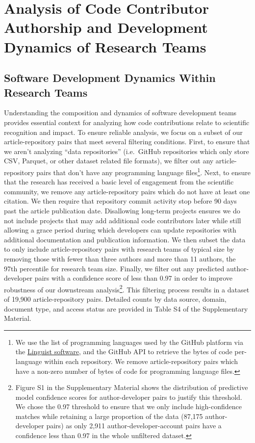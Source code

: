 \documentclass[
  number,
  3p,
  onecolumn]{elsarticle}
\begin{document}
\section{Analysis of Code Contributor Authorship and Development
Dynamics of Research
Teams}\label{analysis-of-code-contributor-authorship-and-development-dynamics-of-research-teams}

\subsection{Software Development Dynamics Within Research
Teams}\label{software-development-dynamics-within-research-teams}

Understanding the composition and dynamics of software development teams
provides essential context for analyzing how code contributions relate
to scientific recognition and impact. To ensure reliable analysis, we
focus on a subset of our article-repository pairs that meet several
filtering conditions. First, to ensure that we aren't analyzing ``data
repositories'' (i.e.~GitHub repositories which only store CSV, Parquet,
or other dataset related file formats), we filter out any
article-repository pairs that don't have any programming language
files\footnote{We use the list of programming languages used by the
  GitHub platform via the
  \href{https://github.com/github-linguist/linguist}{Linguist software},
  and the GitHub API to retrieve the bytes of code per-language within
  each repository. We remove article-repository pairs which have a
  non-zero number of bytes of code for programming language files.}.
Next, to ensure that the research has received a basic level of
engagement from the scientific community, we remove any
article-repository pairs which do not have at least one citation. We
then require that repository commit activity stop before 90 days past
the article publication date. Disallowing long-term projects ensures we
do not include projects that may add additional code contributors later
while still allowing a grace period during which developers can update
repositories with additional documentation and publication information.
We then subset the data to only include article-repository pairs with
research teams of typical size by removing those with fewer than three
authors and more than 11 authors, the 97th percentile for research team
size. Finally, we filter out any predicted author-developer pairs with a
confidence score of less than 0.97 in order to improve robustness of our
downstream analysis\footnote{Figure S1 in the Supplementary Material
  shows the distribution of predictive model confidence scores for
  author-developer pairs to justify this threshold. We chose the 0.97
  threshold to ensure that we only include high-confidence matches while
  retaining a large proportion of the data (87,175 author-developer
  pairs) as only 2,911 author-developer-account pairs have a confidence
  less than 0.97 in the whole unfiltered dataset.}. This filtering
process results in a dataset of 19,900 article-repository pairs.
Detailed counts by data source, domain, document type, and access status
are provided in Table S4 of the Supplementary Material.
\end{document}
